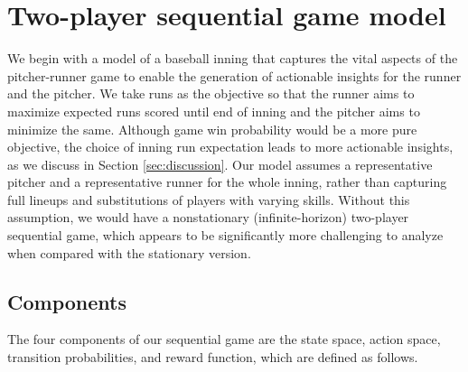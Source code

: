 \documentclass[aoas]{imsart}
\begin{document}
  \section{Two-player sequential game model}
  \label{sec:sg-model}

    We begin with a model of a baseball inning that captures the vital aspects of the pitcher-runner game to enable the generation of actionable insights for the runner and the pitcher. We take runs as the objective so that the runner aims to maximize expected runs scored until end of inning and the pitcher aims to minimize the same. Although game win probability would be a more pure objective, the choice of inning run expectation leads to more actionable insights, as we discuss in Section \ref{sec:discussion}. Our model assumes a representative pitcher and a representative runner for the whole inning, rather than capturing full lineups and substitutions of players with varying skills. Without this assumption, we would have a nonstationary (infinite-horizon) two-player sequential game, which appears to be significantly more challenging to analyze when compared with the stationary version.

    \subsection{Components}
    \label{sec:sequential_gama_components} 
    The four components of our sequential game are the state space, action space, transition probabilities, and reward function, which are defined as follows.
\end{document}
